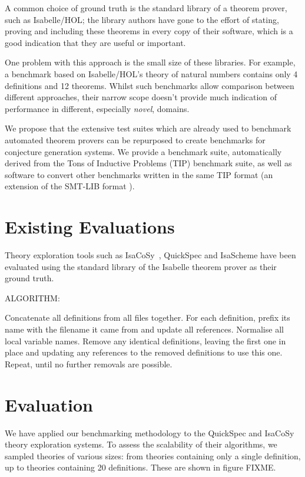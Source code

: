 A common choice of ground truth is the standard library of a theorem prover,
such as Isabelle/HOL; the library authors have gone to the effort of stating,
proving and including these theorems in every copy of their software, which is a
good indication that they are useful or important.

One problem with this approach is the small size of these libraries. For
example, a benchmark based on Isabelle/HOL's theory of natural numbers contains
only 4 definitions and 12 theorems. Whilst such benchmarks allow
comparison between different approaches, their narrow scope doesn't provide much
indication of performance in different, especially \emph{novel}, domains.

We propose that the extensive test suites which are already used to benchmark
automated theorem provers can be repurposed to create benchmarks for conjecture
generation systems. We provide a benchmark suite, automatically derived from the
Tons of Inductive Problems (TIP) benchmark suite, as well as software to convert
other benchmarks written in the same TIP format (an extension of the SMT-LIB
format \cite{BarFT-SMTLIB}).

\section{Existing Evaluations}
\label{sec:previous}

Theory exploration tools such as
IsaCoSy~\cite{Johansson.Dixon.Bundy:conjecture-generation}, QuickSpec and
IsaScheme have been evaluated using the standard library of the Isabelle theorem
prover as their ground truth.

ALGORITHM:

Concatenate all definitions from all files together.
For each definition, prefix its name with the filename it came from and update
all references.
Normalise all local variable names.
Remove any identical definitions, leaving the first one in place and updating
any references to the removed definitions to use this one.
Repeat, until no further removals are possible.

\section{Evaluation}
\label{sec:evaluation}

We have applied our benchmarking methodology to the QuickSpec and IsaCoSy theory
exploration systems. To assess the scalability of their algorithms, we sampled
theories of various sizes: from theories containing only a single definition, up
to theories containing 20 definitions. These are shown in figure FIXME.

